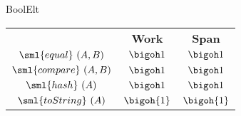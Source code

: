 \begin{costspec}{BoolElt}

\begin{tabular}{c|c|c}
& \textbf{Work} & \textbf{Span} \\
$\sml{equal}~(A,B)$ & $\bigoh 1$ & $\bigoh 1$ \\
$\sml{compare}~(A,B)$ & $\bigoh 1$ & $\bigoh 1$ \\
$\sml{hash}~(A)$ & $\bigoh 1$ & $\bigoh 1$ \\
$\sml{toString}~(A)$ & $\bigoh{1}$ & $\bigoh{1}$ \\
\end{tabular}
\end{costspec}
